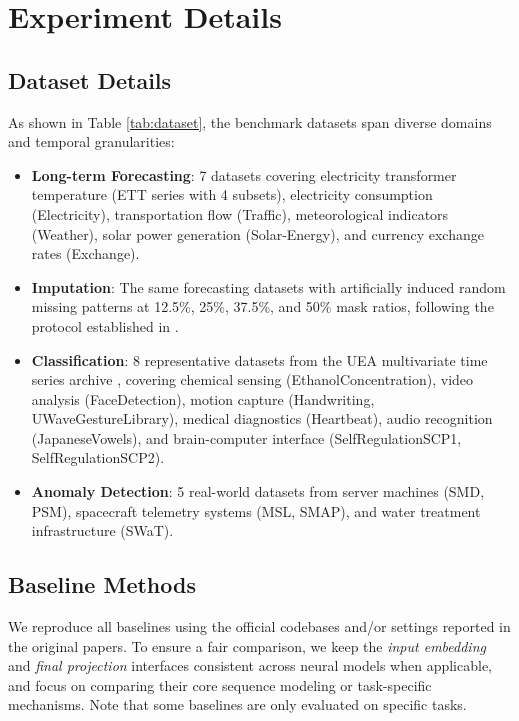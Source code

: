 \section{Experiment Details}
\label{appx:experiment_details}

\subsection{Dataset Details}
\label{appx:dataset_details}


As shown in Table \ref{tab:dataset}, the benchmark datasets span diverse domains and temporal granularities:
\begin{itemize}[leftmargin=*, itemsep=2pt]
    \item \textbf{Long-term Forecasting}: 7 datasets covering electricity transformer temperature (ETT series with 4 subsets), electricity consumption (Electricity), transportation flow (Traffic), meteorological indicators (Weather), solar power generation (Solar-Energy), and currency exchange rates (Exchange).
    \item \textbf{Imputation}: The same forecasting datasets with artificially induced random missing patterns at 12.5\%, 25\%, 37.5\%, and 50\% mask ratios, following the protocol established in \citep{wu2023timesnet}.
    \item \textbf{Classification}: 8 representative datasets from the UEA multivariate time series archive \citep{bagnall2018uea}, covering chemical sensing (EthanolConcentration), video analysis (FaceDetection), motion capture (Handwriting, UWaveGestureLibrary), medical diagnostics (Heartbeat), audio recognition (JapaneseVowels), and brain-computer interface (SelfRegulationSCP1, SelfRegulationSCP2).
    \item \textbf{Anomaly Detection}: 5 real-world datasets from server machines (SMD, PSM), spacecraft telemetry systems (MSL, SMAP), and water treatment infrastructure (SWaT).
\end{itemize}

\subsection{Baseline Methods}
\label{appx:baselines}
We reproduce all baselines using the official codebases and/or settings reported in the original papers.
To ensure a fair comparison, we keep the \emph{input embedding} and \emph{final projection} interfaces consistent across neural models when applicable, and focus on comparing their core sequence modeling or task-specific mechanisms.
Note that some baselines are only evaluated on specific tasks. %

